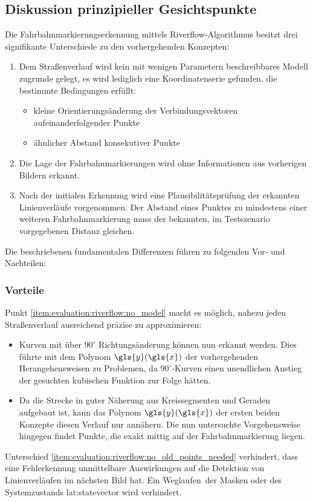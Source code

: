 \subsection{Diskussion prinzipieller Gesichtspunkte} 
Die Fahrbahnmarkierungserkennung mittels Riverflow-Algorithmus besitzt drei signifikante Unterschiede zu den vorhergehenden Konzepten:
\begin{enumerate}
\item \label{item:evaluation:riverflow:no_model}
Dem Straßenverlauf wird kein mit wenigen Parametern beschreibbares Modell zugrunde gelegt, es wird lediglich eine Koordinatenserie gefunden, die bestimmte Bedingungen erfüllt:
\begin{itemize}
\item kleine Orientierungsänderung der Verbindungsvektoren aufeinanderfolgender Punkte
\item ähnlicher Abstand konsekutiver Punkte
\end{itemize}
\item \label{item:evaluation:riverflow:no_old_points_needed}
Die Lage der Fahrbahnmarkierungen wird ohne Informationen aus vorherigen Bildern erkannt.
\item \label{item:evaluation:riverflow:verification}
Nach der initialen Erkennung wird eine Plausibilitätsprüfung der erkannten Linienverläufe vorgenommen. Der Abstand eines Punktes zu mindestens einer weiteren Fahrbahnmarkierung muss der bekannten, im Testszenario vorgegebenen Distanz gleichen. 
\end{enumerate}
Die beschriebenen fundamentalen Differenzen führen zu folgenden Vor- und Nachteilen:

\subsubsection{Vorteile}
Punkt \ref{item:evaluation:riverflow:no_model} macht es möglich, nahezu jeden Straßenverlauf ausreichend präzise zu approximieren:
\begin{itemize} 
\item
Kurven mit über \(90^{\circ}\) Richtungsänderung können nun erkannt werden. Dies führte mit dem Polynom \(\gls{y}(\gls{x})\) der vorhergehenden Herangehensweisen zu Problemen, da \(90^{\circ}\)-Kurven einen unendlichen Anstieg der gesuchten kubischen Funktion zur Folge hätten.
\item
Da die Strecke in guter Näherung aus Kreissegmenten und Geraden aufgebaut ist, kann das  Polynom \(\gls{y}(\gls{x})\) der ersten beiden Konzepte diesen Verlauf nur annähern. Die nun untersuchte Vorgehensweise hingegen findet Punkte, die exakt mittig auf der Fahrbahnmarkierung liegen.
\end{itemize}
Unterschied \ref{item:evaluation:riverflow:no_old_points_needed} verhindert, dass eine Fehlerkennung unmittelbare Auswirkungen auf die Detektion von Linienverläufen im nächsten Bild hat. Ein \glqq Weglaufen\grqq\ der Masken oder des Systemzustands \gls{lat:statevector} wird verhindert.


